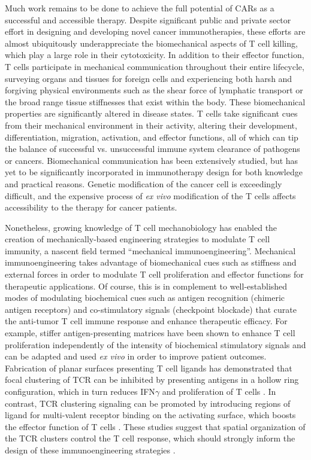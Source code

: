 Much work remains to be done to achieve the full potential of CARs as a successful and accessible therapy. Despite significant public and private sector effort in designing and developing novel cancer immunotherapies, these efforts are almost ubiquitously underappreciate the biomechanical aspects of T cell killing, which play a large role in their cytotoxicity. In addition to their effector function, T cells participate in mechanical communication throughout their entire lifecycle, surveying organs and tissues for foreign cells and experiencing both harsh and forgiving physical environments such as the shear force of lymphatic transport or the broad range tissue stiffnesses that exist within the body. These biomechanical properties are significantly altered in disease states. T cells take significant cues from their mechanical environment in their activity, altering their development, differentiation, migration, activation, and effector functions, all of which can tip the balance of successful vs. unsuccessful immune system clearance of pathogens or cancers. Biomechanical communication has been extensively studied, but has yet to be significantly incorporated in immunotherapy design for both knowledge and practical reasons. Genetic modification of the cancer cell is exceedingly difficult, and the expensive process of \textit{ex vivo} modification of the T cells affects accessibility to the therapy for cancer patients.

Nonetheless, growing knowledge of T cell mechanobiology has enabled the  creation of mechanically-based engineering strategies to modulate T cell immunity, a nascent field termed “mechanical immunoengineering”. Mechanical immunoengineering takes advantage of biomechanical cues such as stiffness and external forces in order to modulate T cell proliferation and effector functions for therapeutic applications. Of course, this is in complement to well-established modes of modulating biochemical cues such as antigen recognition (chimeric antigen receptors) and co-stimulatory signals (checkpoint blockade) that curate the anti-tumor T cell immune response and enhance therapeutic efficacy. For example, stiffer antigen-presenting matrices have been shown to enhance T cell proliferation independently of the intensity of biochemical stimulatory signals \cite{Lei2020} and can be adapted and used \textit{ex vivo} in order to improve patient outcomes. Fabrication of planar surfaces presenting T cell ligands has demonstrated that focal clustering of TCR can be inhibited by presenting antigens in a hollow ring configuration, which in turn reduces IFN$\gamma$ and proliferation of T cells \cite{Schraml2015}. In contrast, TCR clustering signaling can be promoted by introducing regions of ligand for multi-valent receptor binding on the activating surface, which boosts the effector function of T cells \cite{OConnor2012, Schraml2015}.  These studies suggest that spatial organization of the TCR clusters control the T cell response,  which should strongly inform the design of these immunoengineering strategies \cite{Aramesh2019}.

